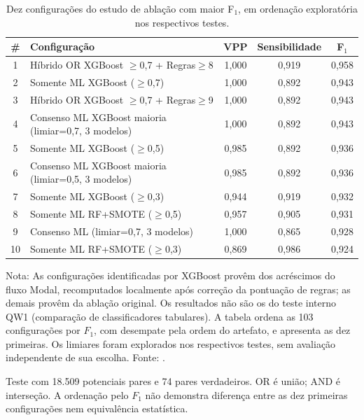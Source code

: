\begin{table}[htbp]
\centering
\caption{Dez configurações do estudo de ablação com maior F$_1$, em ordenação exploratória nos respectivos testes.}
\label{tab:ablation-top10}
\small
\begin{tabular}{cp{8cm}ccc}
\toprule
\# & Configuração & VPP & Sensibilidade & F$_1$ \\
\midrule
1 & Híbrido OR XGBoost $\geq$0,7 + Regras$\geq$8 & 1,000 & 0,919 & 0,958 \\
2 & Somente ML XGBoost ($\geq$0,7) & 1,000 & 0,892 & 0,943 \\
3 & Híbrido OR XGBoost $\geq$0,7 + Regras$\geq$9 & 1,000 & 0,892 & 0,943 \\
4 & Consenso ML XGBoost maioria (limiar=0,7, 3 modelos) & 1,000 & 0,892 & 0,943 \\
5 & Somente ML XGBoost ($\geq$0,5) & 0,985 & 0,892 & 0,936 \\
6 & Consenso ML XGBoost maioria (limiar=0,5, 3 modelos) & 0,985 & 0,892 & 0,936 \\
7 & Somente ML XGBoost ($\geq$0,3) & 0,944 & 0,919 & 0,932 \\
8 & Somente ML RF+SMOTE ($\geq$0,5) & 0,957 & 0,905 & 0,931 \\
9 & Consenso ML (limiar=0,7, 3 modelos) & 1,000 & 0,865 & 0,928 \\
10 & Somente ML RF+SMOTE ($\geq$0,3) & 0,869 & 0,986 & 0,924 \\
\bottomrule
\end{tabular}
\vspace{2pt}
\par\small Nota: As configurações identificadas por XGBoost provêm dos acréscimos do fluxo Modal, recomputados localmente após correção da pontuação de regras; as demais provêm da ablação original. Os resultados não são os do teste interno QW1 (comparação de classificadores tabulares). A tabela ordena as 103 configurações por $F_1$, com desempate pela ordem do artefato, e apresenta as dez primeiras. Os limiares foram explorados nos respectivos testes, sem avaliação independente de sua escolha. Fonte: .
\par\footnotesize Teste com 18.509 potenciais pares e 74 pares verdadeiros. OR é união; AND é interseção. A ordenação pelo $F_1$ não demonstra diferença entre as dez primeiras configurações nem equivalência estatística.
\end{table}
